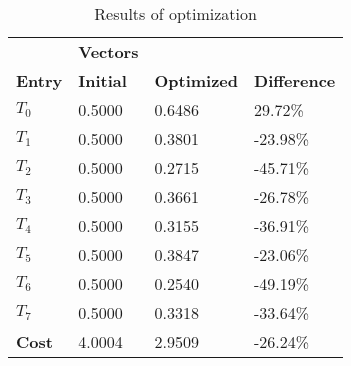 \begin{table}[h!]
\centering
\begin{tabular}{llll}
\textbf{}      & \cellcolor[HTML]{EFEFEF}\textbf{Vectors} & \textbf{} & \textbf{}         \\
\rowcolor[HTML]{EFEFEF} 
\textbf{Entry} & \textbf{Initial} & \textbf{Optimized} & \textbf{Difference} \\
$T_0$ & 0.5000 & 0.6486 & 29.72\% \\ 
$T_1$ & 0.5000 & 0.3801 & -23.98\% \\ 
$T_2$ & 0.5000 & 0.2715 & -45.71\% \\ 
$T_3$ & 0.5000 & 0.3661 & -26.78\% \\ 
$T_4$ & 0.5000 & 0.3155 & -36.91\% \\ 
$T_5$ & 0.5000 & 0.3847 & -23.06\% \\ 
$T_6$ & 0.5000 & 0.2540 & -49.19\% \\ 
$T_7$ & 0.5000 & 0.3318 & -33.64\% \\ 
\rowcolor[HTML]{EFEFEF} 
\textbf{Cost}  & 4.0004 & 2.9509 & -26.24\% \\ 
\end{tabular}
\caption{Results of optimization}
\label{tab:OptimizationAnalysis}
\end{table}
